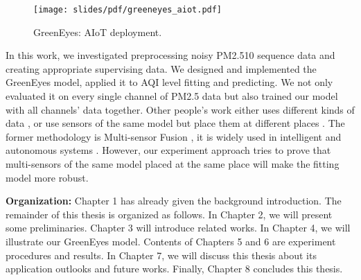 
\begin{figure}[!htbp]
    \begin{center}
    \texttt{[image: slides/pdf/greeneyes\_aiot.pdf]}
    \end{center}
    \caption{GreenEyes: AIoT deployment.}
    \label{fig:greeneyes_aiot}
\end{figure}

In this work, we investigated preprocessing noisy PM2.5\/10 sequence data and creating appropriate supervising data. We designed and implemented the GreenEyes model, applied it to AQI level fitting and predicting. We not only evaluated it on every single channel of PM2.5 data but also trained our model with all channels' data together. Other people's work either uses different kinds of data \cite{han2020joint}, or use sensors of the same model but place them at different places \cite{ray2016internet}. The former methodology is Multi-sensor Fusion \cite{wang2019multi}, it is widely used in intelligent and autonomous systems \cite{luo1989multisensor} \cite{hall1997introduction} \cite{wang2012towards} \cite{cai2020probabilistic}. However, our experiment approach tries to prove that multi-sensors of the same model placed at the same place will make the fitting model more robust.

\textbf{Organization:} Chapter 1 has already given the background introduction. The remainder of this thesis is organized as follows. In Chapter 2, we will present some preliminaries. Chapter 3 will introduce related works. In Chapter 4, we will illustrate our GreenEyes model. Contents of Chapters 5 and 6 are experiment procedures and results. In Chapter 7, we will discuss this thesis about its application outlooks and future works. Finally, Chapter 8 concludes this thesis.
